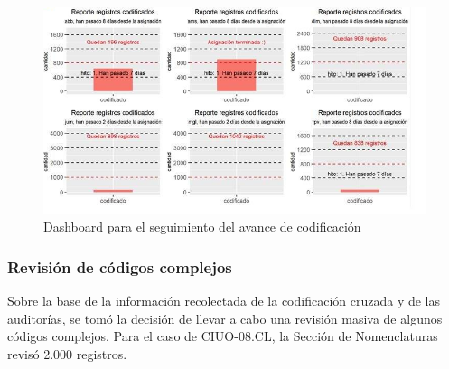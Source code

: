 \documentclass[
  12pt,
  spanish,
]{article}
\begin{document}
\begin{figure}[H]
\centering
\large
\caption{Dashboard para el seguimiento del avance de codificación}
\label{avance_codificacion}
\includegraphics[width = \linewidth]{imagenes/avance_codificacion.png}
\normalsize
\end{figure}

\hypertarget{revisiuxf3n-de-cuxf3digos-complejos}{%
\subsubsection{Revisión de códigos
complejos}\label{revisiuxf3n-de-cuxf3digos-complejos}}

Sobre la base de la información recolectada de la codificación cruzada y
de las auditorías, se tomó la decisión de llevar a cabo una revisión
masiva de algunos códigos complejos. Para el caso de CIUO-08.CL, la
Sección de Nomenclaturas revisó 2.000 registros.
\end{document}
